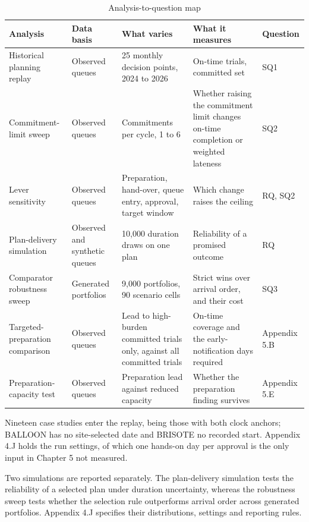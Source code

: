 \begin{table}[htbp]
  \centering
  \caption{Analysis-to-question map}
  \label{tab:analyses}
  \begin{tabularx}{\textwidth}{@{}lLLLL@{}}
    \toprule
    \textbf{Analysis} & \textbf{Data basis} & \textbf{What varies} & \textbf{What it measures} & \textbf{Question} \\
    \midrule
    Historical planning replay & Observed queues & 25 monthly decision points, 2024 to 2026 & On-time trials, committed set & SQ1 \\
    \addlinespace
    Commitment-limit sweep & Observed queues & Commitments per cycle, 1 to 6 & Whether raising the commitment limit changes on-time completion or weighted lateness & SQ2 \\
    \addlinespace
    Lever sensitivity & Observed queues & Preparation, hand-over, queue entry, approval, target window & Which change raises the ceiling & RQ, SQ2 \\
    \addlinespace
    Plan-delivery simulation & Observed and synthetic queues & 10,000 duration draws on one plan & Reliability of a promised outcome & RQ \\
    \addlinespace
    Comparator robustness sweep & Generated portfolios & 9,000 portfolios, 90 scenario cells & Strict wins over arrival order, and their cost & SQ3 \\
    \addlinespace
    Targeted-preparation comparison & Observed queues & Lead to high-burden committed trials only, against all committed trials & On-time coverage and the early-notification days required & Appendix 5.B \\
    \addlinespace
    Preparation-capacity test & Observed queues & Preparation lead against reduced capacity & Whether the preparation finding survives & Appendix 5.E \\
    \bottomrule
  \end{tabularx}
\end{table}

Nineteen case studies enter the replay, being those with both clock anchors; BALLOON has no site-selected date and BRISOTE no recorded start. Appendix 4.J holds the run settings, of which one hands-on day per approval is the only input in Chapter 5 not measured.

Two simulations are reported separately. The plan-delivery simulation tests the reliability of a selected plan under duration uncertainty, whereas the robustness sweep tests whether the selection rule outperforms arrival order across generated portfolios. Appendix 4.J specifies their distributions, settings and reporting rules.

